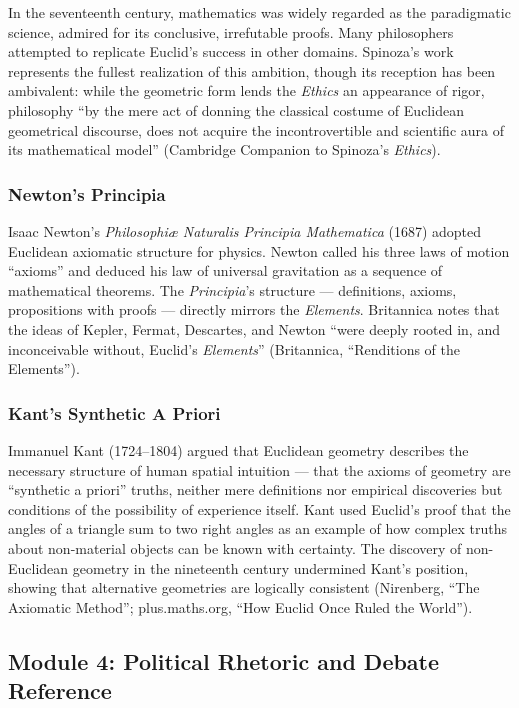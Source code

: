 \documentclass[11pt,letterpaper]{article}
\begin{document}
In the seventeenth century, mathematics was widely regarded as the paradigmatic science, admired for its conclusive, irrefutable proofs. Many philosophers attempted to replicate Euclid's success in other domains. Spinoza's work represents the fullest realization of this ambition, though its reception has been ambivalent: while the geometric form lends the \textit{Ethics} an appearance of rigor, philosophy ``by the mere act of donning the classical costume of Euclidean geometrical discourse, does not acquire the incontrovertible and scientific aura of its mathematical model'' (Cambridge Companion to Spinoza's \textit{Ethics}).

\subsubsection{Newton's Principia}

Isaac Newton's \textit{Philosophi\ae{} Naturalis Principia Mathematica} (1687) adopted Euclidean axiomatic structure for physics. Newton called his three laws of motion ``axioms'' and deduced his law of universal gravitation as a sequence of mathematical theorems. The \textit{Principia}'s structure --- definitions, axioms, propositions with proofs --- directly mirrors the \textit{Elements}. Britannica notes that the ideas of Kepler, Fermat, Descartes, and Newton ``were deeply rooted in, and inconceivable without, Euclid's \textit{Elements}'' (Britannica, ``Renditions of the Elements'').

\subsubsection{Kant's Synthetic A Priori}

Immanuel Kant (1724--1804) argued that Euclidean geometry describes the necessary structure of human spatial intuition --- that the axioms of geometry are ``synthetic a priori'' truths, neither mere definitions nor empirical discoveries but conditions of the possibility of experience itself. Kant used Euclid's proof that the angles of a triangle sum to two right angles as an example of how complex truths about non-material objects can be known with certainty. The discovery of non-Euclidean geometry in the nineteenth century undermined Kant's position, showing that alternative geometries are logically consistent (Nirenberg, ``The Axiomatic Method''; plus.maths.org, ``How Euclid Once Ruled the World'').

\subsection{Module 4: Political Rhetoric and Debate Reference}
\end{document}
